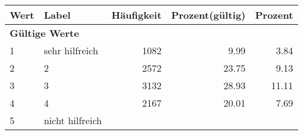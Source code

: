      \begin{longtable}{lXrrr}
     \toprule
     \textbf{Wert} & \textbf{Label} & \textbf{Häufigkeit} & \textbf{Prozent(gültig)} & \textbf{Prozent} \\
     \endhead
     \midrule
     \multicolumn{5}{l}{\textbf{Gültige Werte}}\\

     1 &
     \multicolumn{1}{X}{ sehr hilfreich   } &


       \num{1082} &
       \num[round-mode=places,round-precision=2]{9.99} &
         \num[round-mode=places,round-precision=2]{3.84} \\

     2 &
     \multicolumn{1}{X}{ 2   } &


       \num{2572} &
       \num[round-mode=places,round-precision=2]{23.75} &
         \num[round-mode=places,round-precision=2]{9.13} \\

     3 &
     \multicolumn{1}{X}{ 3   } &


       \num{3132} &
       \num[round-mode=places,round-precision=2]{28.93} &
         \num[round-mode=places,round-precision=2]{11.11} \\

     4 &
     \multicolumn{1}{X}{ 4   } &


       \num{2167} &
       \num[round-mode=places,round-precision=2]{20.01} &
         \num[round-mode=places,round-precision=2]{7.69} \\

     5 &
     \multicolumn{1}{X}{ nicht hilfreich   } &



\end{longtable}
